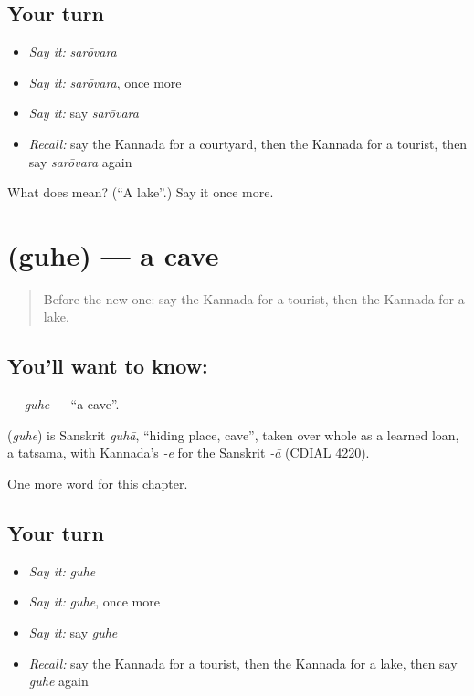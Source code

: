 \subsection*{Your turn}
\begin{itemize}
\raggedright
  \item \emph{Say it:} \emph{sarōvara}
  \item \emph{Say it:} \emph{sarōvara}, once more
  \item \emph{Say it:} say \emph{sarōvara}
  \item \emph{Recall:} say the Kannada for a courtyard, then the Kannada for a tourist, then say \emph{sarōvara} again
\end{itemize}

\begin{tcolorbox}[breakable,colback=teal!4,colframe=teal!35!black,title={Before you move on}]
What does  mean? (\textquotedblleft{}A lake\textquotedblright{}.) Say it once more.
\end{tcolorbox}
\section[\texorpdfstring{\kn{ಗುಹೆ} (guhe)}{ಗುಹೆ (guhe)}]{ (guhe) — a cave}

\label{lesson:KA-C174-guhe}



\begin{quote}
Before the new one: say the Kannada for a tourist, then the Kannada for a lake.
\end{quote}

\subsection*{You'll want to know: }
\textbf{} — \emph{guhe} — \textquotedblleft{}a cave\textquotedblright{}.

\begin{cousinweb}
\textbf{} (\emph{guhe}) is Sanskrit \emph{guhā}, \textquotedblleft{}hiding place, cave\textquotedblright{}, taken over whole as a learned loan, a tatsama, with Kannada's \emph{-e} for the Sanskrit \emph{-ā} (CDIAL 4220).
\end{cousinweb}

\begin{grammarlens}[title={What you've built}]
One more word for this chapter.
\end{grammarlens}

\subsection*{Your turn}
\begin{itemize}
\raggedright
  \item \emph{Say it:} \emph{guhe}
  \item \emph{Say it:} \emph{guhe}, once more
  \item \emph{Say it:} say \emph{guhe}
  \item \emph{Recall:} say the Kannada for a tourist, then the Kannada for a lake, then say \emph{guhe} again
\end{itemize}


